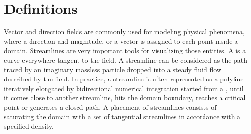 \section{Definitions}
\label{Section_2D_Streamlines_Definitions}
Vector and direction fields are commonly used for modeling physical
phenomena, where a direction and magnitude, or a vector is assigned to
each point inside a domain. Streamlines are very important tools for
visualizing those entities. A  is a curve
everywhere tangent to the field.  A streamline can be considered as
the path traced by an imaginary massless particle dropped into a
steady fluid flow described by the field. In practice, a streamline is
often represented as a polyline iteratively elongated by bidirectional
numerical integration started from a , until it comes
close to another streamline, hits the domain boundary, reaches a
critical point or generates a closed path. A  placement of
streamlines consists of saturating the domain with a set of tangential
streamlines in accordance with a specified density.

